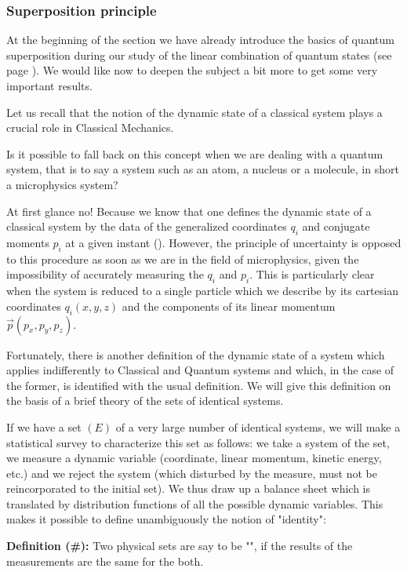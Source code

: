 	\pagebreak
	\subsubsection{Superposition principle}
	At the beginning of the section we have already introduce the basics of quantum superposition during our study of the linear combination of quantum states (see page \pageref{quantum superposition}). We would like now to deepen the subject a bit more to get some very important results.

	Let us recall that the notion of the dynamic state of a classical system plays a crucial role in Classical Mechanics.

	Is it possible to fall back on this concept when we are dealing with a quantum system, that is to say a system such as an atom, a nucleus or a molecule, in short a microphysics system?
	
	At first glance no! Because we know that one defines the dynamic state of a classical system by the data of the generalized coordinates $q_i$ and conjugate moments $p_i$ at a given instant (). However, the principle of uncertainty is opposed to this procedure as soon as we are in the field of microphysics, given the impossibility of accurately measuring the $q_i$ and $p_i$. This is particularly clear when the system is reduced to a single particle which we describe by its cartesian coordinates $q_i(x,y,z)$ and the components of its linear momentum $\vec{p}(p_x,p_y,p_z)$.

	Fortunately, there is another definition of the dynamic state of a system which applies indifferently to Classical and Quantum systems and which, in the case of the former, is identified with the usual definition. We will give this definition on the basis of a brief theory of the sets of identical systems.
	
	If we have a set $(E)$ of a very large number of identical systems, we will make a statistical survey to characterize this set as follows: we take a system of the set, we measure a dynamic variable (coordinate, linear momentum, kinetic energy, etc.) and we reject the system (which disturbed by the measure, must not be reincorporated to the initial set). We thus draw up a balance sheet which is translated by distribution functions of all the possible dynamic variables. This makes it possible to define unambiguously the notion of "identity":
	
	\textbf{Definition (\#\mydef):} Two physical sets are say to be "", if the results of the measurements are the same for the both.
	
